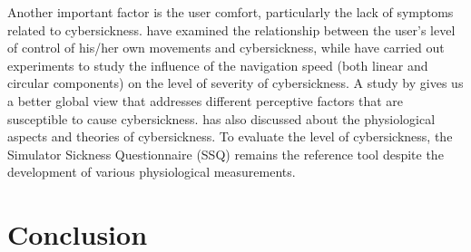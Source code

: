 Another important factor is the user comfort, particularly the lack of symptoms related to cybersickness. \citet{Rich1996AICS} have examined the relationship between the user's level of control of his/her own movements and cybersickness, while \citet{So2001ENS} have carried out experiments to study the influence of the navigation speed (both linear and circular components) on the level of severity of cybersickness. A study by \citet{Stanney2002HPIVE} gives us a better global view that addresses different perceptive factors that are susceptible to cause cybersickness. \citet{LaViola2000DCV} has also discussed about the physiological aspects and theories of cybersickness. To evaluate the level of cybersickness, the Simulator Sickness Questionnaire (SSQ) \citep{Kennedy1993SSQ} remains the reference tool despite the development of various physiological measurements.

\section{Conclusion}

